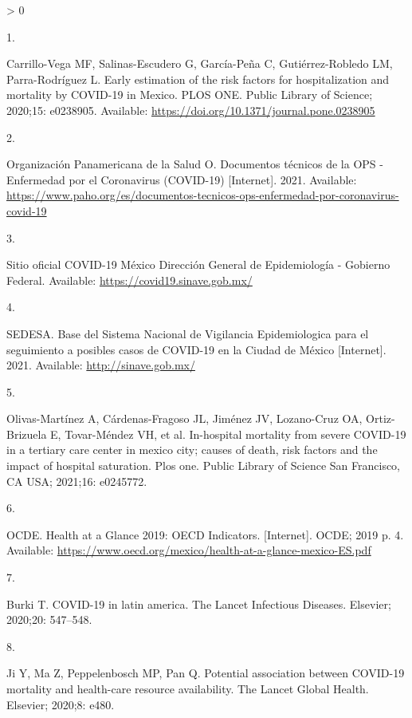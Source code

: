 \documentclass[10pt,letterpaper]{article}
\newlength{\csllabelwidth}
\newlength{\cslhangindent}
\newenvironment{CSLReferences}[3] %
 {%
  \setlength{\parindent}{0pt}
  \ifodd #1 \everypar{\setlength{\hangindent}{\cslhangindent}}\ignorespaces\fi
  \ifnum #2 > 0
  \setlength{\parskip}{#2\baselineskip}
  \fi
 }%
 {}
\newcommand{\CSLLeftMargin}[1]{\parbox[t]{\csllabelwidth}{#1}}
\newcommand{\CSLRightInline}[1]{\parbox[t]{\linewidth - \csllabelwidth}{#1}}
\begin{document}
\hypertarget{refs}{}
\begin{CSLReferences}{0}{0}
\leavevmode\hypertarget{ref-Carrillo-Vega2020}{}%
\CSLLeftMargin{1. }
\CSLRightInline{Carrillo-Vega MF, Salinas-Escudero G, García-Peña C,
Gutiérrez-Robledo LM, Parra-Rodríguez L. {Early estimation of the risk
factors for hospitalization and mortality by COVID-19 in Mexico}. PLOS
ONE. Public Library of Science; 2020;15: e0238905. Available:
\url{https://doi.org/10.1371/journal.pone.0238905}}

\leavevmode\hypertarget{ref-OrganizacionPanamericanadelaSalud2021}{}%
\CSLLeftMargin{2. }
\CSLRightInline{Organización Panamericana de la Salud O. {Documentos
t{é}cnicos de la OPS - Enfermedad por el Coronavirus (COVID-19)}
{[}Internet{]}. 2021. Available:
\url{https://www.paho.org/es/documentos-tecnicos-ops-enfermedad-por-coronavirus-covid-19}}

\leavevmode\hypertarget{ref-covidgob}{}%
\CSLLeftMargin{3. }
\CSLRightInline{Sitio oficial COVID-19 M{é}xico Direcci{ó}n General de
Epidemiolog{í}a - Gobierno Federal. Available:
\url{https://covid19.sinave.gob.mx/}}

\leavevmode\hypertarget{ref-SEDESA2021}{}%
\CSLLeftMargin{4. }
\CSLRightInline{SEDESA. {Base del Sistema Nacional de Vigilancia
Epidemiologica para el seguimiento a posibles casos de COVID-19 en la
Ciudad de M{é}xico} {[}Internet{]}. 2021. Available:
\url{http://sinave.gob.mx/}}

\leavevmode\hypertarget{ref-olivas2021hospital}{}%
\CSLLeftMargin{5. }
\CSLRightInline{Olivas-Martínez A, Cárdenas-Fragoso JL, Jiménez JV,
Lozano-Cruz OA, Ortiz-Brizuela E, Tovar-Méndez VH, et al. In-hospital
mortality from severe COVID-19 in a tertiary care center in mexico city;
causes of death, risk factors and the impact of hospital saturation.
Plos one. Public Library of Science San Francisco, CA USA; 2021;16:
e0245772. }

\leavevmode\hypertarget{ref-OCDE2019}{}%
\CSLLeftMargin{6. }
\CSLRightInline{OCDE. {Health at a Glance 2019: OECD Indicators.}
{[}Internet{]}. OCDE; 2019 p. 4. Available:
\url{https://www.oecd.org/mexico/health-at-a-glance-mexico-ES.pdf}}

\leavevmode\hypertarget{ref-burki2020covid}{}%
\CSLLeftMargin{7. }
\CSLRightInline{Burki T. COVID-19 in latin america. The Lancet
Infectious Diseases. Elsevier; 2020;20: 547--548. }

\leavevmode\hypertarget{ref-ji2020potential}{}%
\CSLLeftMargin{8. }
\CSLRightInline{Ji Y, Ma Z, Peppelenbosch MP, Pan Q. Potential
association between COVID-19 mortality and health-care resource
availability. The Lancet Global Health. Elsevier; 2020;8: e480. }


\end{CSLReferences}
\end{document}
